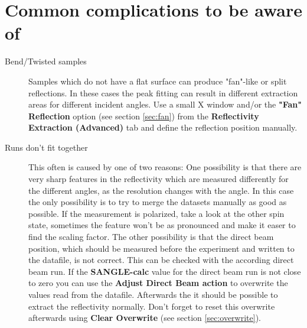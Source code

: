 \section{Common complications to be aware of}
  \begin{description}
   \item[Bend/Twisted samples] Samples which do not have a flat surface can produce "fan"-like or split reflections. In these cases the peak fitting can result in different extraction areas for different incident angles. Use a small X window and/or the \textbf{"Fan" Reflection} option (see section \ref{sec:fan}) from the \textbf{Reflectivity Extraction (Advanced)} tab and define the reflection position manually.
   
   \item[Runs don't fit together] This often is caused by one of two reasons: One possibility is that there are very sharp features in the reflectivity which are measured differently for the different angles, as the resolution changes with the angle. In this case the only possibility is to try to merge the datasets manually as good as possible. If the measurement is polarized, take a look at the other spin state, sometimes the feature won't be as pronounced and make it easer to find the scaling factor. The other possibility is that the direct beam position, which should be measured before the experiment and written to the datafile, is not correct. This can be checked with the according direct beam run. If the \textbf{SANGLE-calc} value for the direct beam run is not close to zero you can use the \textbf{Adjust Direct Beam action}  to overwrite the values read from the datafile. Afterwards the it should be possible to extract the reflectivity normally. Don't forget to reset this overwrite afterwards using \textbf{Clear Overwrite} (see section \ref{sec:overwrite}).
  \end{description}

